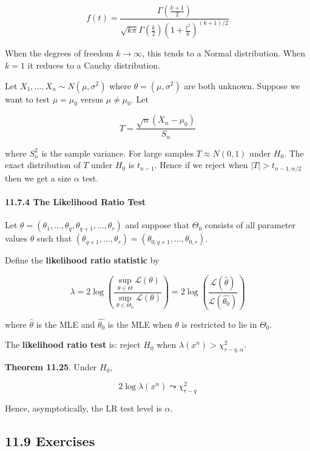 \[ f(t) = \frac{\Gamma\left(\frac{k+1}{2}\right)}{\sqrt{k \pi} \Gamma\left(\frac{k}{2}\right) \left(1 + \frac{t^2}{k}\right)^{(k+1)/2}}\]

When the degrees of freedom \(k \rightarrow \infty\), this tends to a
Normal distribution. When \(k = 1\) it reduces to a Cauchy distribution.

Let \(X_1, \dots, X_n \sim N(\mu, \sigma^2)\) where
\(\theta = (\mu, \sigma^2)\) are both unknown. Suppose we want to test
\(\mu = \mu_0\) versus \(\mu \neq \mu_0\). Let

\[T = \frac{\sqrt{n}(\overline{X}_n - \mu_0)}{S_n}\]

where \(S_n^2\) is the sample variance. For large samples
\(T \approx N(0, 1)\) under \(H_0\). The exact distribution of \(T\)
under \(H_0\) is \(t_{n-1}\). Hence if we reject when
\(|T| > t_{n-1, \alpha/2}\) then we get a size \(\alpha\) test.

\paragraph{11.7.4 The Likelihood Ratio
Test}\label{the-likelihood-ratio-test}

Let
\(\theta = (\theta_1, \dots, \theta_q, \theta_{q+1}, \dots, \theta_r)\)
and suppose that \(\Theta_0\) consists of all parameter values
\(\theta\) such that
\((\theta_{q+1}, \dots, \theta_r) = (\theta_{0, q+1}, \dots, \theta_{0, r})\).

Define the \textbf{likelihood ratio statistic} by

\[ \lambda 
= 2 \log \left(  \frac{\sup_{\theta \in \Theta} \mathcal{L}(\theta)}{\sup_{\theta \in \Theta_0} \mathcal{L}(\theta)} \right) 
= 2 \log \left(  \frac{\mathcal{L}(\hat{\theta})}{\mathcal{L}(\hat{\theta_0})} \right) \]

where \(\hat{\theta}\) is the MLE and \(\hat{\theta_0}\) is the MLE when
\(\theta\) is restricted to lie in \(\Theta_0\).

The \textbf{likelihood ratio test} is: reject \(H_0\) when
\(\lambda(x^n) > \chi^2_{r-q, \alpha}\).

\textbf{Theorem 11.25}. Under \(H_0\),

\[ 2 \log \lambda (x^n) \leadsto \chi^2_{r - q}\]

Hence, asymptotically, the LR test level is \(\alpha\).

\subsection{11.9 Exercises}\label{exercises}

